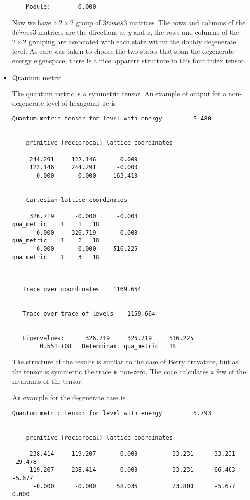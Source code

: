 \documentclass[11pt]{article}
\begin{document}
\begin{itemize}
\begin{verbatim}
    Module:        0.000
      \end{verbatim}
      Now we have a $2 \times 2$ group of $3 times 3$ matrices.
      The rows and columns of the $3 times 3$ matrices are the directions $x$, $y$ and $z$,
      the rows and columns of the $2 \times 2$ grouping are associated
      with each state within the doubly degenerate level.
      As care was taken to choose the two states that span the degenerate energy
      eigenspace, there is a nice apparent structure to this four index tensor.


      \item{Quantum metric}

      The quantum metric is a symmetric tensor.
      An example of output for a non-degenerate level of hexagonal Te is
      \begin{verbatim}
Quantum metric tensor for level with energy         5.480


    primitive (reciprocal) lattice coordinates

     244.291     122.146      -0.000
     122.146     244.291      -0.000
      -0.000      -0.000     163.410


    Cartesian lattice coordinates

     326.719      -0.000      -0.000                        qua_metric    1    1   18
      -0.000     326.719      -0.000                        qua_metric    1    2   18
      -0.000      -0.000     516.225                        qua_metric    1    3   18



   Trace over coordinates    1169.664


   Trace over trace of levels    1169.664


   Eigenvalues:      326.719     326.719     516.225
        0.551E+08   Determinant qua_metric   18
      \end{verbatim}
      The structure of the results is similar to the case of
      Berry curvature, but as the tensor is symmetric the trace is non-zero.
      The code calculates a few of the invariants of the tensor.

      An example for the degenerate case is
      \begin{verbatim}
Quantum metric tensor for level with energy         5.793


    primitive (reciprocal) lattice coordinates

     238.414     119.207      -0.000         -33.231      33.231     -29.478
     119.207     238.414      -0.000          33.231      66.463      -5.677
      -0.000      -0.000      58.036          23.800      -5.677       0.000


\end{verbatim}
\end{itemize}
\end{document}
